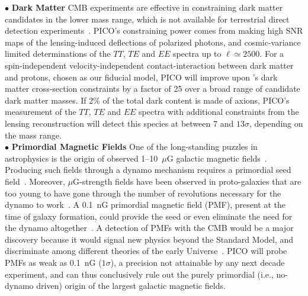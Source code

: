 \documentclass[PICOAPC.tex]{subfiles}
\begin{document}
\noindent$\bullet$ {\bf Dark Matter} \hspace{0.1in} \ac{CMB} experiments are effective in constraining dark matter candidates in the lower mass range, which is not available for terrestrial direct detection experiments~\citep{Slatyer2009,Galli2009,Huetsi2009,Huetsi2011,Madhavacheril:2013cna,Green:2018pmd}. 
PICO's constraining power comes from making high \ac{SNR} maps of the lensing-induced deflections of polarized photons, and cosmic-variance limited determinations of the $TT$, $TE$ and $EE$ spectra up to $\ell \simeq 2500$. 
For a spin-independent velocity-independent contact-interaction between dark matter and protons, chosen as our fiducial model, PICO will improve upon \planck 's dark matter cross-section constraints by a factor of 25 over a broad range of candidate dark matter masses. 
If 2\% of the total dark content is made of axions, PICO's measurement of the $TT$, $TE$ and $EE$ spectra with additional constraints from the lensing reconstruction will detect this species at between $7$ and $13\sigma$, depending on the mass range.   \\
$\bullet$ {\bf Primordial Magnetic Fields} \hspace{0.1in} One of the long-standing puzzles in astrophysics is the origin of observed 1--10~$\mu$G galactic magnetic fields~\citep{Widrow:2002ud}. Producing such fields through a dynamo mechanism requires a primordial seed field~\citep{Widrow:2011hs}. Moreover, $\mu$G-strength fields have been observed in proto-galaxies that are too young to have gone through the number of revolutions necessary for the dynamo to work~\citep{Athreya:1998}. A 0.1~nG primordial magnetic field (PMF), present at the time of galaxy formation, could provide the seed or even eliminate the need for the dynamo altogether~\citep{Grasso:2000wj}. 
A detection of PMFs with the CMB would be a major discovery because it would signal new physics beyond the Standard Model, and discriminate among different theories of the early Universe~\cite{Barnaby:2012tk,Long:2013tha,Durrer:2013pga}. PICO will probe PMFs as weak as 0.1~nG ($1\sigma$), a precision not attainable by any next decade experiment, and can thus conclusively rule out the purely primordial (i.e., no-dynamo driven) origin of the largest galactic magnetic fields. \\
\end{document}
